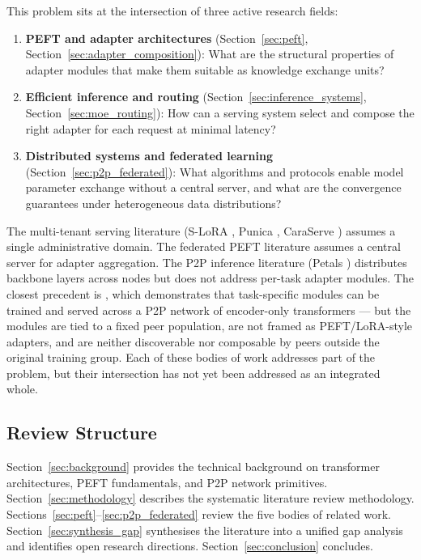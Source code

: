 This problem sits at the intersection of three active research fields:
\begin{enumerate}
  \item \textbf{PEFT and adapter architectures} (Section~\ref{sec:peft},
    Section~\ref{sec:adapter_composition}): What are the structural properties of
    adapter modules that make them suitable as knowledge exchange units?
  \item \textbf{Efficient inference and routing} (Section~\ref{sec:inference_systems},
    Section~\ref{sec:moe_routing}): How can a serving system select and compose the
    right adapter for each request at minimal latency?
  \item \textbf{Distributed systems and federated learning} (Section~\ref{sec:p2p_federated}):
    What algorithms and protocols enable model parameter exchange without a central
    server, and what are the convergence guarantees under heterogeneous data
    distributions?
\end{enumerate}

The multi-tenant serving literature (S-LoRA \citep{Sheng2024}, Punica \citep{Chen2023Punica}, 
CaraServe \citep{Li2024CaraServe}) assumes a single administrative domain. 
The federated PEFT literature assumes a central server for adapter aggregation. 
The P2P inference literature (Petals \citep{Borzunov2023}) distributes backbone 
layers across nodes but does not address per-task adapter modules. The closest precedent is 
\citet{Sajina2024}, which demonstrates that task-specific modules can be trained and served 
across a P2P network of encoder-only transformers — but the modules are tied to a fixed peer 
population, are not framed as PEFT/LoRA-style adapters, and are neither discoverable nor composable 
by peers outside the original training group. Each of these bodies of work addresses part
of the problem, but their intersection has not yet been addressed as an integrated whole.

\subsection{Review Structure}
\label{sec:introduction:structure}

Section~\ref{sec:background} provides the technical background on transformer
architectures, PEFT fundamentals, and P2P network primitives. Section~\ref{sec:methodology}
describes the systematic literature review methodology. Sections~\ref{sec:peft}--\ref{sec:p2p_federated}
review the five bodies of related work. Section~\ref{sec:synthesis_gap} synthesises the
literature into a unified gap analysis and identifies open research directions.
Section~\ref{sec:conclusion} concludes.
